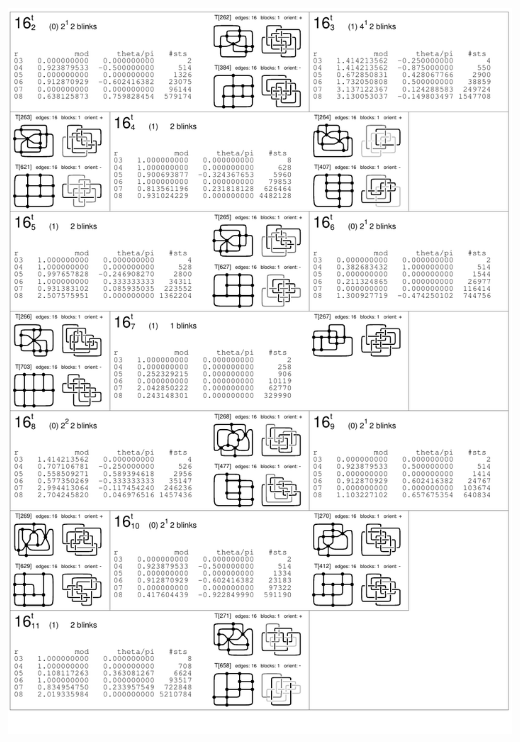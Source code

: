 \begin{center}
 \includegraphics[height=23.5cm]{E.figsbw2/con3catalog015_bw.pdf} \eject

\end{center}
